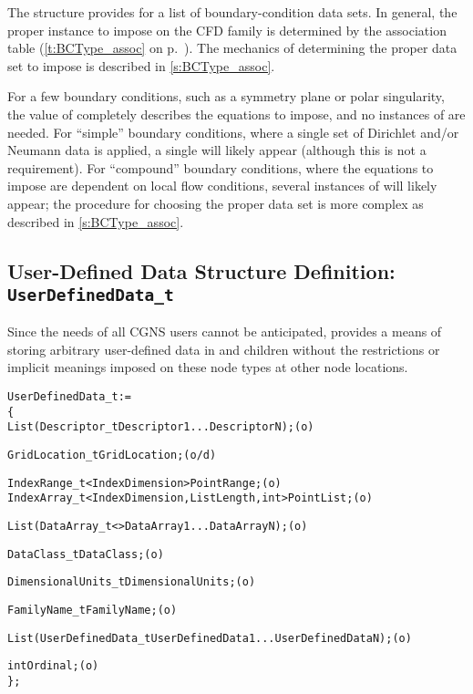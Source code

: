 The  structure provides for a list of
boundary-condition data sets.
In general, the proper  instance to impose on
the CFD family is determined by the  association table
(\autoref{t:BCType_assoc} on p.~\pageref*{t:BCType_assoc}).
The mechanics of determining the proper data set to impose is described
in \autoref{s:BCType_assoc}.

For a few boundary conditions, such as a symmetry plane or polar
singularity, the value of  completely describes the
equations to impose, and no instances of  are needed.
For ``simple'' boundary conditions, where a single set of Dirichlet
and/or Neumann data is applied, a single  will likely
appear (although this is not a requirement).
For ``compound'' boundary conditions, where the equations to impose
are dependent on local flow conditions, several instances of
 will likely appear; the procedure for choosing the
proper data set is more complex as described in \autoref{s:BCType_assoc}.

\subsection{User-Defined Data Structure Definition: \texttt{UserDefinedData\_t}}
\label{s:UserDefinedData}

Since the needs of all CGNS users cannot be anticipated,
 provides a means of storing arbitrary
user-defined data in  and 
children without the restrictions or implicit meanings imposed on these
node types at other node locations.

\begin{alltt}
  UserDefinedData\_t :=
    \{
    List( Descriptor\_t Descriptor1 ... DescriptorN ) ;                      (o)

    GridLocation\_t GridLocation ;                                           (o/d)

    IndexRange\_t<IndexDimension> PointRange ;                               (o)
    IndexArray\_t<IndexDimension, ListLength, int> PointList ;               (o)

    List( DataArray\_t<> DataArray1 ... DataArrayN ) ;                       (o)

    DataClass\_t DataClass ;                                                 (o)

    DimensionalUnits\_t DimensionalUnits ;                                   (o)

    FamilyName\_t FamilyName ;                                               (o)

    List( UserDefinedData\_t UserDefinedData1 ... UserDefinedDataN ) ;       (o)

    int Ordinal ;                                                           (o)
    \} ;
\end{alltt}

